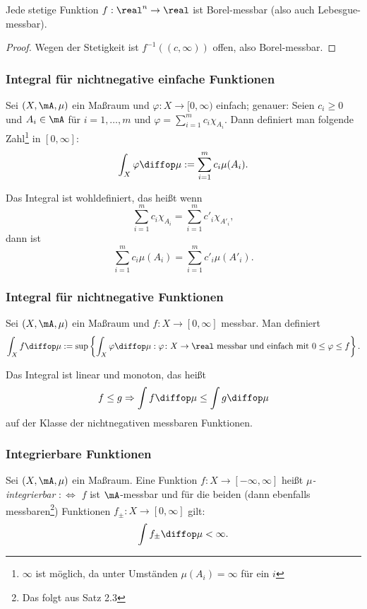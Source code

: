 \begin{rmrk}
 Jede stetige Funktion $f:\real^n \to \real$ ist Borel-messbar (also auch Lebesgue-messbar).
\end{rmrk}

\begin{proof}
 Wegen der Stetigkeit ist $f^{-1}((c,\infty))$ offen, also Borel-messbar.
\end{proof}

\subsubsection{Integral für nichtnegative einfache Funktionen}
Sei $(X,\mA,\mu)$ ein Maßraum und $\varphi\colon X \to [0, \infty)$ einfach; genauer: Seien $c_i \ge 0$ und $A_i \in \mA$ für $i=1,\ldots,m$ und $\varphi = \sum_{i=1}^m c_i \chi_{A_i}$. Dann definiert man folgende Zahl\footnote{{$\infty$ ist möglich, da unter Umständen $\mu(A_i) = \infty$ für ein $i$}} in $[0,\infty]$:
\[ \int_X \varphi \diffop \mu := \sum_{i=1}^m c_i \mu( A_i ). \]

\begin{rmrk}
 Das Integral ist wohldefiniert, das heißt wenn
 \[ \sum_{i=1}^m c_i \chi_{A_i} = \sum_{i=1}^m c'_i \chi_{A'_i}, \]
 dann ist 
 \[ \sum_{i=1}^m c_i \mu(A_i) = \sum_{i=1}^m c'_i \mu(A'_i). \]
\end{rmrk}

\subsubsection{Integral für nichtnegative Funktionen}
Sei $(X,\mA,\mu)$ ein Maßraum und $f\colon X \to [0, \infty]$ messbar. Man definiert
\[ \int_X f \diffop \mu := \sup \left\{ \int_X \varphi \diffop \mu : \varphi\colon X \to \real \text{ messbar und einfach mit } 0 \le \varphi \le f \right\}. \]

\begin{rmrk}
 Das Integral ist linear und monoton, das heißt
 \[ f \le g \Rightarrow \int f \diffop \mu \le \int g \diffop \mu \]
 auf der Klasse der nichtnegativen messbaren Funktionen.
\end{rmrk}

\subsubsection{Integrierbare Funktionen}
Sei $(X,\mA,\mu)$ ein Maßraum. Eine Funktion $f:X \to [-\infty,\infty]$ heißt \emph{$\mu$-integrierbar} $:\Leftrightarrow$ $f$ ist $\mA$-messbar und für die beiden (dann ebenfalls messbaren\footnote{Das folgt aus Satz 2.3}) Funktionen $f_\pm \colon X \to [0,\infty]$ gilt:
\[ \int f_\pm \diffop \mu < \infty. \]

